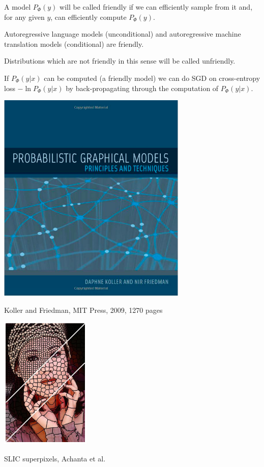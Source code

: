 {

A model $P_\Phi(y)$ will be called {\color{red} friendly} if we can efficiently sample from it and, for any given $y$, can efficiently compute $P_\Phi(y)$.

\vfill
{\color{red} Autoregressive} language models (unconditional) and autoregressive machine translation models (conditional) are {\color{red} friendly}.


\vfill
Distributions which are not friendly in this sense will be called {\color{red} unfriendly}.



{\color{red} If $P_\Phi(y|x)$ can be computed} (a friendly model)
we can do SGD on cross-entropy loss {\color{red} $- \ln P_\Phi(y|x)$} by back-propagating
through the computation of $P_\Phi(y|x)$.


\centerline{\includegraphics[height = 4in]{../images/Koller}}
\centerline{Koller and Friedman, MIT Press, 2009, 1270 pages}

\centerline{\includegraphics[height = 2.5in]{../images/SLICcolor}}
\centerline{\huge SLIC superpixels, Achanta et al.}

}
